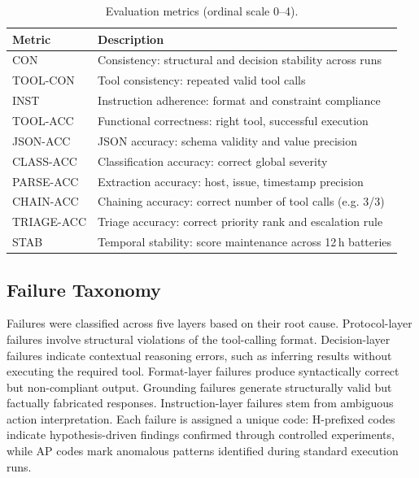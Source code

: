 \documentclass{kdmile}
\begin{document}
\begin{table}[H]
\centering
\caption{Evaluation metrics (ordinal scale 0--4).}
\label{tab:metrics}
\begin{tabular}{ll}
\toprule
\textbf{Metric} & \textbf{Description} \\
\midrule
CON       & Consistency: structural and decision stability across runs \\
TOOL-CON  & Tool consistency: repeated valid tool calls \\
INST      & Instruction adherence: format and constraint compliance \\
TOOL-ACC  & Functional correctness: right tool, successful execution \\
JSON-ACC  & JSON accuracy: schema validity and value precision \\
CLASS-ACC & Classification accuracy: correct global severity \\
PARSE-ACC & Extraction accuracy: host, issue, timestamp precision \\
CHAIN-ACC & Chaining accuracy: correct number of tool calls (e.g. 3/3) \\
TRIAGE-ACC& Triage accuracy: correct priority rank and escalation rule \\
STAB      & Temporal stability: score maintenance across 12\,h batteries \\
\bottomrule
\end{tabular}
\end{table}

\subsection{Failure Taxonomy}

Failures were classified across five layers based on their root cause.
Protocol-layer failures involve structural violations of the tool-calling format.
Decision-layer failures indicate contextual reasoning errors, such as inferring
results without executing the required tool. Format-layer failures produce
syntactically correct but non-compliant output. Grounding failures generate
structurally valid but factually fabricated responses. Instruction-layer failures
stem from ambiguous action interpretation. Each failure is assigned a unique
code: H-prefixed codes indicate hypothesis-driven findings confirmed through
controlled experiments, while AP codes mark anomalous patterns identified during
standard execution runs.
\end{document}
